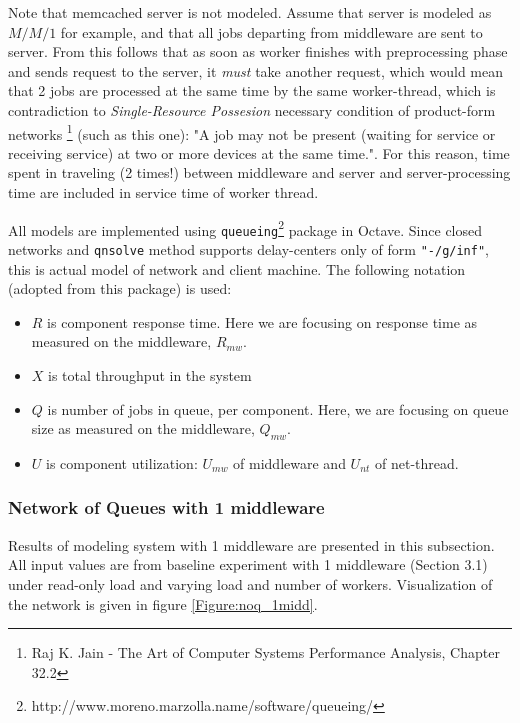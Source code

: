 \documentclass[11pt,a4paper]{article}
\begin{document}
Note that memcached server is not modeled. Assume that server is modeled as $M/M/1$ for example, and that all jobs departing from middleware are sent to server. From this follows that as soon as worker finishes with preprocessing phase and sends request to the server, it \textit{must} take another request, which would mean that 2 jobs are processed at the same time by the same worker-thread, which is contradiction to \textit{Single-Resource Possesion} necessary condition of product-form networks \footnote{Raj K. Jain - The Art of Computer Systems Performance Analysis, Chapter 32.2} (such as this one): "A job may not be present (waiting for service or receiving service) at two or more devices at the same time.". For this reason, time spent in traveling (2 times!) between middleware and server and server-processing time are included in service time of worker thread.

All models are implemented using \texttt{queueing}\footnote{http://www.moreno.marzolla.name/software/queueing/} package in Octave. Since closed networks and \texttt{qnsolve} method supports delay-centers only of form \texttt{"-/g/inf"}, this is actual model of network and client machine. The following notation (adopted from this package) is used:
\begin{itemize}
	\item $R$ is component response time. Here we are focusing on response time as measured on the middleware, $R_{mw}$.
	\item $X$ is total throughput in the system
	\item $Q$ is number of jobs in queue, per component. Here, we are focusing on queue size as measured on the middleware, $Q_{mw}$.
	\item $U$ is component utilization: $U_{mw}$ of middleware and $U_{nt}$ of net-thread.
\end{itemize}

\subsubsection{Network of Queues with 1 middleware}

Results of modeling system with 1 middleware are presented in this subsection. All input values are from baseline experiment with 1 middleware (Section 3.1) under read-only load and varying load and number of workers. Visualization of the network is given in figure \ref{Figure:noq_1midd}.
\end{document}
